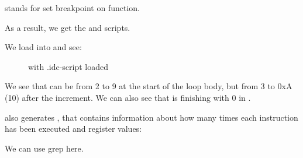  stands for set breakpoint on function.

As a result, we get the  and  scripts.

\clearpage
We load  into \IDA and see:

\begin{figure}[H]
\centering
{}
\caption{\IDA with .idc-script loaded}
\label{fig:loops_IDA_tracer}
\end{figure}

We see that \ESI can be from 2 to 9 at the start of the loop body,
but from 3 to 0xA (10) after the increment.
We can also see that \main is finishing with 0 in \EAX.

\tracer also generates , 
that contains information about how many times each instruction has been executed and
register values:


\myindex{\GrepUsage}
We can use grep here.

